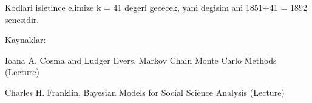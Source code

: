 \documentclass[12pt,fleqn]{article}
\begin{document}
Kodlari isletince elimize k = 41 degeri gececek, yani degisim ani
1851+41 = 1892 senesidir.



Kaynaklar: 

Ioana A. Cosma and Ludger Evers, Markov Chain Monte Carlo Methods (Lecture) 

Charles H. Franklin, Bayesian Models for Social Science Analysis (Lecture)
\end{document}
